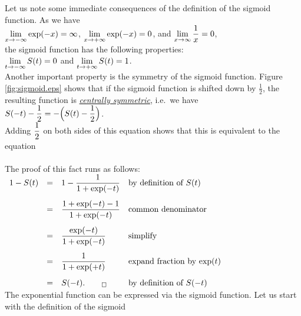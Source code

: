 \noindent
Let us note some immediate consequences of the definition of the sigmoid function.  As we have
\\[0.2cm]
\hspace*{1.3cm}
$\displaystyle\lim\limits_{x\rightarrow-\infty} \exp(-x) = \infty$, \quad 
$\displaystyle\lim\limits_{x\rightarrow+\infty} \exp(-x) = 0$, \quad and \quad
$\displaystyle\lim\limits_{x\rightarrow\infty} \frac{1}{x} = 0$, 
\\[0.2cm]
the sigmoid function has the following properties:
\\[0.2cm]
\hspace*{1.3cm}
$\displaystyle \lim_{t\rightarrow-\infty} S(t) = 0$ \quad and \quad
$\displaystyle \lim_{t\rightarrow+\infty} S(t) = 1$.
\\[0.2cm]
Another important property is the symmetry of the sigmoid function.  Figure \ref{fig:sigmoid.eps} shows that if the
sigmoid function is shifted down by $\frac{1}{2}$, the resulting function is 
\href{https://en.wikipedia.org/wiki/Point_reflection}{\emph{centrally symmetric}}, i.e.~we have
\\[0.2cm]
\hspace*{1.3cm}
$\displaystyle S(-t) - \frac{1}{2} = -\Bigl(S(t) - \frac{1}{2}\Bigr)$.
\\[0.2cm]
Adding $\displaystyle\frac{1}{2}$ on both sides of this equation shows that this is equivalent to the equation
\\[0.2cm]
\hspace*{1.3cm}
\colorbox{red}{}
\\[0.2cm]
The proof of this fact runs as follows:
\\[0.2cm]
\hspace*{1.3cm}
$
\begin{array}{lcll}
1 - S(t) & = & \displaystyle 1 - \frac{1}{1 + \exp(-t)}             & \mbox{by definition of $S(t)$}           \\[0.5cm]
         & = & \displaystyle \frac{1 + \exp(-t) - 1}{1 + \exp(-t)}  & \mbox{common denominator}                \\[0.5cm]
         & = & \displaystyle \frac{\exp(-t)}{1 + \exp(-t)}          & \mbox{simplify}                          \\[0.5cm]
         & = & \displaystyle \frac{1}{1 + \exp(+t)}                 & \mbox{expand fraction by $\exp(t)$}      \\[0.5cm]
         & = & S(-t). \qquad _\Box                         & \mbox{by definition of $S(-t)$}
\end{array}
$
\\[0.2cm]
The exponential function can be expressed via the sigmoid function.  Let us start with the definition of the sigmoid
